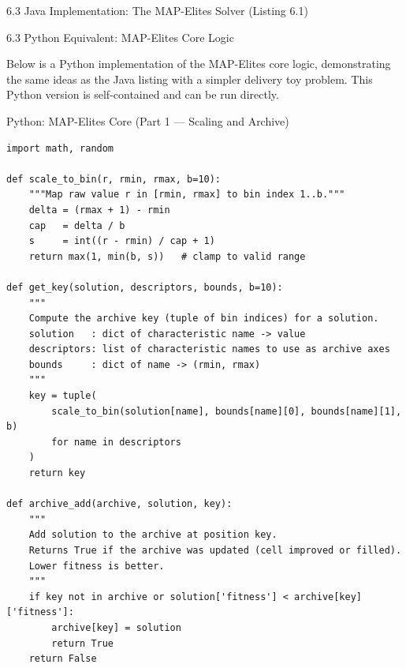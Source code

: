 \documentclass[aspectratio=169,10pt]{beamer}
\begin{document}
\begin{frame}[fragile]{6.3 Java Implementation: The MAP-Elites Solver (Listing 6.1)}
\end{frame}

\begin{frame}[allowframebreaks]{6.3 Python Equivalent: MAP-Elites Core Logic}

Below is a Python implementation of the MAP-Elites core logic,
demonstrating the same ideas as the Java listing with a simpler
delivery toy problem.
This Python version is self-contained and can be run directly.

\end{frame}

\begin{frame}[fragile]{Python: MAP-Elites Core (Part 1 --- Scaling and Archive)}

\begin{lstlisting}[style=python, caption={Python: bin scaling and archive add}]
import math, random

def scale_to_bin(r, rmin, rmax, b=10):
    """Map raw value r in [rmin, rmax] to bin index 1..b."""
    delta = (rmax + 1) - rmin
    cap   = delta / b
    s     = int((r - rmin) / cap + 1)
    return max(1, min(b, s))   # clamp to valid range

def get_key(solution, descriptors, bounds, b=10):
    """
    Compute the archive key (tuple of bin indices) for a solution.
    solution   : dict of characteristic name -> value
    descriptors: list of characteristic names to use as archive axes
    bounds     : dict of name -> (rmin, rmax)
    """
    key = tuple(
        scale_to_bin(solution[name], bounds[name][0], bounds[name][1], b)
        for name in descriptors
    )
    return key

def archive_add(archive, solution, key):
    """
    Add solution to the archive at position key.
    Returns True if the archive was updated (cell improved or filled).
    Lower fitness is better.
    """
    if key not in archive or solution['fitness'] < archive[key]['fitness']:
        archive[key] = solution
        return True
    return False
\end{lstlisting}

\end{frame}
\end{document}
